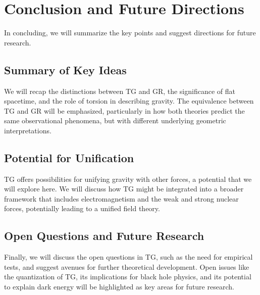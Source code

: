 \documentclass[12pt]{article}
\begin{document}
\section{Conclusion and Future Directions}
In concluding, we will summarize the key points and suggest directions for future research.

\subsection{Summary of Key Ideas}
We will recap the distinctions between TG and GR, the significance of flat spacetime, and the role of torsion in describing gravity. The equivalence between TG and GR will be emphasized, particularly in how both theories predict the same observational phenomena, but with different underlying geometric interpretations.

\subsection{Potential for Unification}
TG offers possibilities for unifying gravity with other forces, a potential that we will explore here. We will discuss how TG might be integrated into a broader framework that includes electromagnetism and the weak and strong nuclear forces, potentially leading to a unified field theory.

\subsection{Open Questions and Future Research}
Finally, we will discuss the open questions in TG, such as the need for empirical tests, and suggest avenues for further theoretical development. Open issues like the quantization of TG, its implications for black hole physics, and its potential to explain dark energy will be highlighted as key areas for future research.

\newpage


\end{document}
